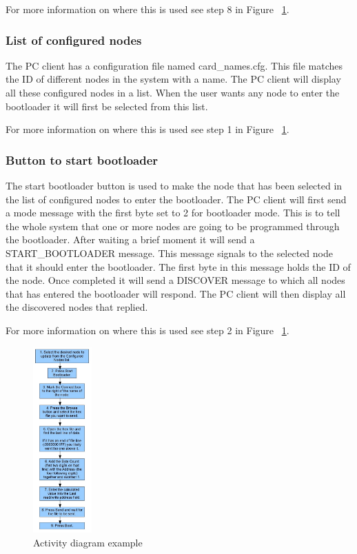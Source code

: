 For more information on where this is used see step 8 in Figure ~\ref{fig:activity_figure}.

\subsubsection{List of configured nodes}
The PC client has a configuration file named card\_names.cfg. This file matches the ID of different nodes in the system with a name. The PC client will display all these configured nodes in a list. When the user wants any node to enter the bootloader it will first be selected from this list.

For more information on where this is used see step 1 in Figure ~\ref{fig:activity_figure}.

\subsubsection{Button to start bootloader}
The start bootloader button is used to make the node that has been selected in the list of configured nodes to enter the bootloader. The PC client will first send a mode message with the first byte set to 2 for bootloader mode. This is to tell the whole system that one or more nodes are going to be programmed through the bootloader. After waiting a brief moment it will send a START\_BOOTLOADER message. This message signals to the selected node that it should enter the bootloader. The first byte in this message holds the ID of the node. Once completed it will send a DISCOVER message to which all nodes that has entered the bootloader will respond. The PC client will then display all the discovered nodes that replied.

For more information on where this is used see step 2 in Figure ~\ref{fig:activity_figure}.

\begin{figure}[h]
\begin{center}
    \includegraphics[width=0.20\textwidth]{./figure/activity.jpg}
\end{center}
    \caption{Activity diagram example}
    \label{fig:activity_figure}
\end{figure}